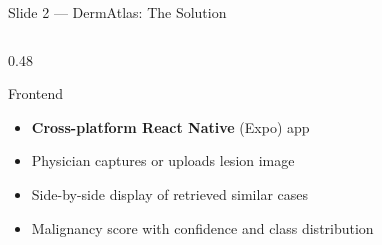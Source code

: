 \documentclass[aspectratio=169, 9pt]{beamer}
\begin{document}
\begin{frame}{Slide 2 --- DermAtlas: The Solution}
\begin{columns}[T]
\begin{column}{0.48\textwidth}
      \vspace{0.3em}
      \begin{block}{Frontend}
        \small
        \begin{itemize}[leftmargin=1em, itemsep=2pt]
          \item \textbf{Cross-platform React Native} (Expo) app
          \item Physician captures or uploads lesion image
          \item Side-by-side display of retrieved similar cases
          \item Malignancy score with confidence and class distribution
        \end{itemize}
      \end{block}
    \end{column}

  \end{columns}

\end{frame}
\end{document}
